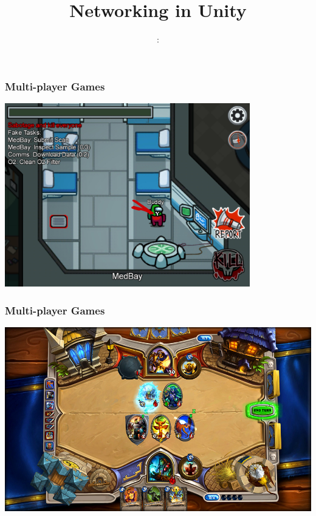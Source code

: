\usepackage{../../../beamerthemeFalmouthGamesAcademy}
\usepackage{multimedia}
\graphicspath{ {../../../} }


\usepackage[normalem]{ulem}
\usepackage{wasysym}

\usepackage{pdfpages}

\usetikzlibrary{arrows,automata}




\title{Networking in Unity}
\subtitle{\modulecode: \moduletitle}

\frame{\titlepage} 

	\begin{frame}
	\frametitle{Multi-player Games}
	
	\begin{center}
	\includegraphics[width=0.8\textwidth]{game_amungus}
	\end{center}

	\end{frame}

	\begin{frame}
		\frametitle{Multi-player Games}
		\includegraphics[width=\textwidth]{game_harthstone}
	\end{frame}


